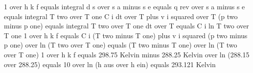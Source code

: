 1 over h k f equals integral d s over s a minus s e equals q rev over s a minus s e equals integral T two over T one C i dt over T plus v i squared over T (p two minus p one)
equals integral T two over T one dt over T equals C i ln T two over T one
1 over h k f equals C i (T two minus T one) plus v i squared (p two minus p one) over ln (T two over T one)
equals (T two minus T one) over ln (T two over T one)
1 over h k f equals 298.75 Kelvin minus 288.25 Kelvin over ln (288.15 over 288.25)
equals 10 over ln (h aus over h ein) equals 293.121 Kelvin